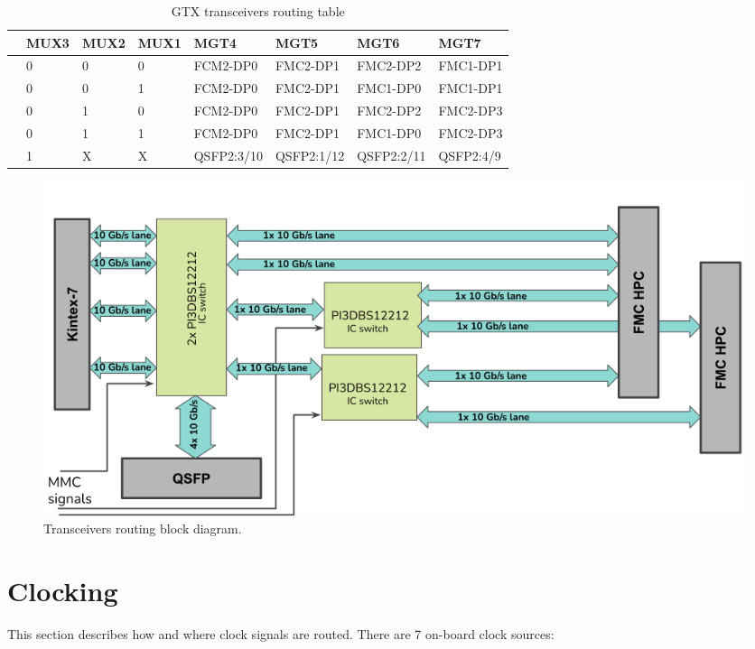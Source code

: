\documentclass[12pt,oneside,a4]{article}
\begin{document}
\begin{table}[htbp]
\begin{tabular}{@{}llllllll@{}}
\toprule
 & MUX3 & MUX2 & MUX1 & MGT4       & MGT5       & MGT6       & MGT7      \\ \midrule
 & 0    & 0    & 0    & FCM2-DP0   & FMC2-DP1   & FMC2-DP2   & FMC1-DP1  \\
 & 0    & 0    & 1    & FCM2-DP0   & FMC2-DP1   & FMC1-DP0   & FMC1-DP1  \\
 & 0    & 1    & 0    & FCM2-DP0   & FMC2-DP1   & FMC2-DP2   & FMC2-DP3  \\
 & 0    & 1    & 1    & FCM2-DP0   & FMC2-DP1   & FMC1-DP0   & FMC2-DP3  \\
 & 1    & X    & X    & QSFP2:3/10 & QSFP2:1/12 & QSFP2:2/11 & QSFP2:4/9 \\ \bottomrule
\end{tabular}
\caption{GTX transceivers routing table}\label{tab:gtx_routing}
\end{table}

\begin{figure}[H]
\begin{center}
\includegraphics[width=1\linewidth]{highspeed.png}
 \caption{Transceivers routing block diagram.}\label{highspeed}
\end{center}
\end{figure}

\section{Clocking}
This section describes how and where clock signals are routed. There are 7 on-board clock sources:
\end{document}
